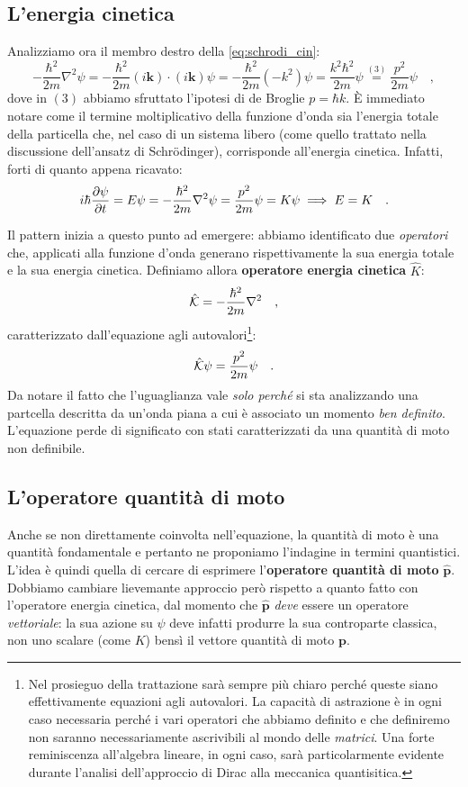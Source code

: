\subsection{L'energia cinetica}
Analizziamo ora il membro destro della \eqref{eq:schrodi_cin}:
\begin{equation*}
    -\frac{\hbar^2}{2m}\nabla^2 \psi = -\frac{\hbar^2}{2m} (i\bm{k}) \cdot (i\bm{k}) \psi = -\frac{\hbar^2}{2m} (-k^2) \psi = \frac{k^2\hbar^2}{2m} \psi \overset{(3)}{=} \frac{p^2}{2m} \psi \quad,
\end{equation*}
dove in $(3)$ abbiamo sfruttato l'ipotesi di de Broglie $p = \hbar k$. È immediato notare come il termine moltiplicativo della funzione d'onda sia l'energia totale della particella che, nel caso di un sistema libero (come quello trattato nella discussione dell'ansatz di Schrödinger), corrisponde all'energia cinetica. Infatti, forti di quanto appena ricavato:
\[
        i\hbar\pdv{\psi}{t} = E\psi = -\frac{\hbar^2}{2m}\nabla^2\psi = \frac{p^2}{2m}\psi = K\psi \implies
        E = K \quad.
\]

Il pattern inizia a questo punto ad emergere: abbiamo identificato due \emph{operatori} che, applicati alla funzione d'onda generano rispettivamente la sua energia totale e la sua energia cinetica. Definiamo allora \textbf{operatore energia cinetica} $\hat{K}$:
\begin{equation}
    {\hat{\mathcal{K}} = -\frac{\hbar^2}{2m}\nabla^2} \quad,
    \label{eq:operatore_K}
\end{equation}
caratterizzato dall'equazione agli autovalori\footnote{Nel prosieguo della trattazione sarà sempre più chiaro perché queste siano effettivamente equazioni agli autovalori. La capacità di astrazione è in ogni caso necessaria perché i vari operatori che abbiamo definito e che definiremo non saranno necessariamente ascrivibili al mondo delle \emph{matrici}. Una forte reminiscenza all'algebra lineare, in ogni caso, sarà particolarmente evidente durante l'analisi dell'approccio di Dirac alla meccanica quantisitica.}:
\[
    \hat{\mathcal{K}}\psi = \frac{p^2}{2m} \psi \quad.
\]
Da notare il fatto che l'uguaglianza vale \emph{solo perché} si sta analizzando una partcella descritta da un'onda piana a cui è associato un momento \emph{ben definito}. L'equazione perde di significato con stati caratterizzati da una quantità di moto non definibile. 

\subsection{L'operatore quantità di moto}
Anche se non direttamente coinvolta nell'equazione, la quantità di moto è una quantità fondamentale e pertanto ne proponiamo l'indagine in termini quantistici. L'idea è quindi quella di cercare di esprimere l'\textbf{operatore quantità di moto} $\hat{\bm{p}}$. Dobbiamo cambiare lievemante approccio però rispetto a quanto fatto con l'operatore energia cinetica, dal momento che $\hat{\bm{p}}$ \emph{deve} essere un operatore \emph{vettoriale}: la sua azione su $\psi$ deve infatti produrre la sua controparte classica, non uno scalare (come $K$) bensì il vettore quantità di moto $\bm{p}$. 

